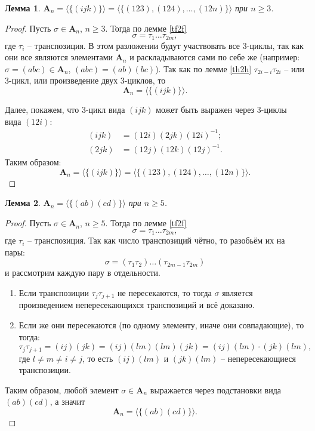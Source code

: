 \documentclass{article}
\newtheorem{lemma}{Лемма}[section]
\begin{document}
\begin{lemma} \label{wkpa}
    $\mathbf{A}_n = \langle \{(ijk)\} \rangle = \langle \{ (123), (124), \ldots, (12n) \} \rangle$ при $n \geqslant 3$.
\end{lemma}
\begin{proof}
    Пусть $\sigma \in \mathbf{A}_n$, $n \geqslant 3$. Тогда по лемме \ref{tf2f} $$ \sigma = \tau_1 \ldots \tau_{2m}, $$ где $\tau_i$ -- транспозиция. В этом разложении будут участвовать все 3-циклы, так как они все являются элементами $\mathbf{A}_n$ и раскладываются сами по себе же (например: $\sigma = (abc) \in \mathbf{A}_n$, $(abc) = (ab)(bc)$). Так как по лемме \ref{th2h} $\tau_{2i - i} \tau_{2i}$ -- или 3-цикл, или произведение двух 3-циклов, то $$ \mathbf{A}_n = \langle \{ (ijk) \} \rangle. $$

    Далее, покажем, что 3-цикл вида $(ijk)$ может быть выражен через 3-циклы вида $(12i)$:
    \begin{align*}
        (ijk) &= (12i)(2jk)(12i)^{-1}; \\
        (2jk) &= (12j)(12k)(12j)^{-1}.
    \end{align*}
    Таким образом: $$ \mathbf{A}_n = \langle \{ (ijk) \} \rangle = \langle \{ (123), (124), \ldots, (12n) \} \rangle. $$
\end{proof}

\begin{lemma} \label{Qt}
    $\mathbf{A}_n = \langle \{(ab)(cd)\} \rangle$ при $n \geqslant 5$.
\end{lemma}
\begin{proof}
    Пусть $\sigma \in \mathbf{A}_n$, $n \geqslant 5$. Тогда по лемме \ref{tf2f} $$ \sigma = \tau_1 \ldots \tau_{2m}, $$ где $\tau_i$ -- транспозиция.
    Так как число транспозиций чётно, то разобьём их на пары: $$\sigma = (\tau_1 \tau_2) \ldots (\tau_{2m - 1} \tau_{2m})$$ и рассмотрим каждую пару в отдельности.

    \begin{enumerate}
        \item Если транспозиции $ \tau_j \tau_{j + 1} $ не пересекаются, то тогда $\sigma$ является произведением непересекающихся транспозиций и всё доказано.
        \item Если же они пересекаются (по одному элементу, иначе они совпадающие), то тогда: $$ \tau_j \tau_{j + 1} = (ij) (jk) = (ij) (lm) (lm) (jk) = (ij)(lm) \cdot (jk)(lm), $$ где $l \neq m \neq i \neq j$, то есть $(ij)(lm)$ и $(jk)(lm)$ -- непересекающиеся транспозиции.
    \end{enumerate}

    Таким образом, любой элемент $\sigma \in \mathbf{A}_n$ выражается через подстановки вида $(ab)(cd)$, а значит $$ \mathbf{A}_n = \langle \{ (ab)(cd) \} \rangle. $$
\end{proof}
\end{document}
